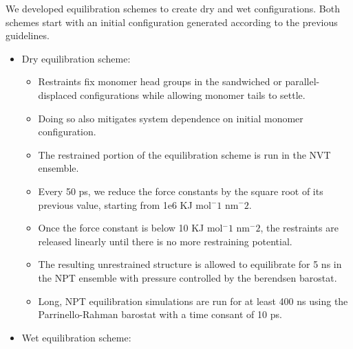 \documentclass{article}
\begin{document}
  We developed equilibration schemes to create dry and wet configurations. Both schemes 
  start with an initial configuration generated according to the previous guidelines.
  \begin{itemize}
      \item Dry equilibration scheme:
      \begin{itemize}
          \item Restraints fix monomer head groups in the sandwiched or parallel-displaced
          configurations while allowing monomer tails to settle.
          \item Doing so also mitigates system dependence on initial monomer configuration.
          \item The restrained portion of the equilibration scheme is run in the NVT ensemble.
          \item Every 50 ps, we reduce the force constants by the square root of its
          previous value, starting from 1e6 KJ mol$^-1$ nm$^-2$.
          \item Once the force constant is below 10 KJ mol$^-1$ nm$^-2$, the restraints are
          released linearly until there is no more restraining potential.
          \item The resulting unrestrained structure is allowed to equilibrate for 5 ns 
	  in the NPT ensemble with pressure controlled by the berendsen barostat.
	  \item Long, NPT equilibration simulations are run for at least 400 ns using the 
          Parrinello-Rahman barostat with a time consant of 10 ps.
      \end{itemize}
      \item Wet equilibration scheme: 
      \begin{itemize}

\end{itemize}
\end{itemize}
\end{document}
